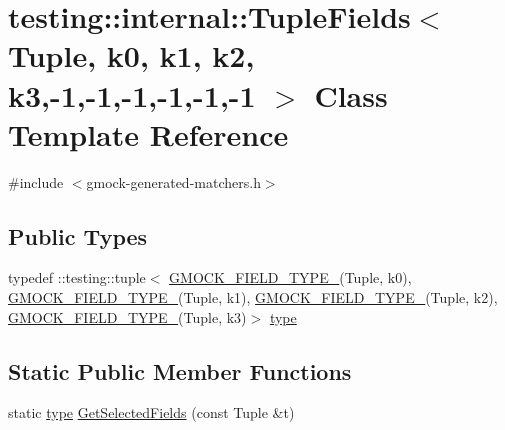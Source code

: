 \hypertarget{classtesting_1_1internal_1_1_tuple_fields_3_01_tuple_00_01k0_00_01k1_00_01k2_00_01k3_00-1_00-1_00-1_00-1_00-1_00-1_01_4}{}\section{testing\+:\+:internal\+:\+:Tuple\+Fields$<$ Tuple, k0, k1, k2, k3,-\/1,-\/1,-\/1,-\/1,-\/1,-\/1 $>$ Class Template Reference}
\label{classtesting_1_1internal_1_1_tuple_fields_3_01_tuple_00_01k0_00_01k1_00_01k2_00_01k3_00-1_00-1_00-1_00-1_00-1_00-1_01_4}


{\ttfamily \#include $<$gmock-\/generated-\/matchers.\+h$>$}

\subsection*{Public Types}
\begin{DoxyCompactItemize}
\item 
typedef \+::testing\+::tuple$<$ \hyperlink{gmock-generated-matchers_8h_acf3e27de83a73f0d873da1cd471e505b}{G\+M\+O\+C\+K\+\_\+\+F\+I\+E\+L\+D\+\_\+\+T\+Y\+P\+E\+\_\+}(Tuple, k0), \hyperlink{gmock-generated-matchers_8h_acf3e27de83a73f0d873da1cd471e505b}{G\+M\+O\+C\+K\+\_\+\+F\+I\+E\+L\+D\+\_\+\+T\+Y\+P\+E\+\_\+}(Tuple, k1), \hyperlink{gmock-generated-matchers_8h_acf3e27de83a73f0d873da1cd471e505b}{G\+M\+O\+C\+K\+\_\+\+F\+I\+E\+L\+D\+\_\+\+T\+Y\+P\+E\+\_\+}(Tuple, k2), \hyperlink{gmock-generated-matchers_8h_acf3e27de83a73f0d873da1cd471e505b}{G\+M\+O\+C\+K\+\_\+\+F\+I\+E\+L\+D\+\_\+\+T\+Y\+P\+E\+\_\+}(Tuple, k3)$>$ \hyperlink{classtesting_1_1internal_1_1_tuple_fields_3_01_tuple_00_01k0_00_01k1_00_01k2_00_01k3_00-1_00-1_00-1_00-1_00-1_00-1_01_4_a9e082889b5cbbbc44c95a2cec23d4646}{type}
\end{DoxyCompactItemize}
\subsection*{Static Public Member Functions}
\begin{DoxyCompactItemize}
\item 
static \hyperlink{classtesting_1_1internal_1_1_tuple_fields_3_01_tuple_00_01k0_00_01k1_00_01k2_00_01k3_00-1_00-1_00-1_00-1_00-1_00-1_01_4_a9e082889b5cbbbc44c95a2cec23d4646}{type} \hyperlink{classtesting_1_1internal_1_1_tuple_fields_3_01_tuple_00_01k0_00_01k1_00_01k2_00_01k3_00-1_00-1_00-1_00-1_00-1_00-1_01_4_a3ef0caad002de28085c87c65fcca983a}{Get\+Selected\+Fields} (const Tuple \&t)
\end{DoxyCompactItemize}


